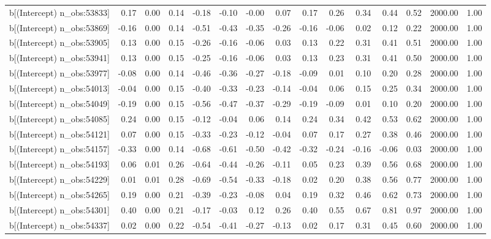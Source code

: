 \begin{table}[ht]
\begin{tabular}{rrrrrrrrrrrrrrr}
  b[(Intercept) n\_obs:53833] & 0.17 & 0.00 & 0.14 & -0.18 & -0.10 & -0.00 & 0.07 & 0.17 & 0.26 & 0.34 & 0.44 & 0.52 & 2000.00 & 1.00 \\ 
  b[(Intercept) n\_obs:53869] & -0.16 & 0.00 & 0.14 & -0.51 & -0.43 & -0.35 & -0.26 & -0.16 & -0.06 & 0.02 & 0.12 & 0.22 & 2000.00 & 1.00 \\ 
  b[(Intercept) n\_obs:53905] & 0.13 & 0.00 & 0.15 & -0.26 & -0.16 & -0.06 & 0.03 & 0.13 & 0.22 & 0.31 & 0.41 & 0.51 & 2000.00 & 1.00 \\ 
  b[(Intercept) n\_obs:53941] & 0.13 & 0.00 & 0.15 & -0.25 & -0.16 & -0.06 & 0.03 & 0.13 & 0.23 & 0.31 & 0.41 & 0.50 & 2000.00 & 1.00 \\ 
  b[(Intercept) n\_obs:53977] & -0.08 & 0.00 & 0.14 & -0.46 & -0.36 & -0.27 & -0.18 & -0.09 & 0.01 & 0.10 & 0.20 & 0.28 & 2000.00 & 1.00 \\ 
  b[(Intercept) n\_obs:54013] & -0.04 & 0.00 & 0.15 & -0.40 & -0.33 & -0.23 & -0.14 & -0.04 & 0.06 & 0.15 & 0.25 & 0.34 & 2000.00 & 1.00 \\ 
  b[(Intercept) n\_obs:54049] & -0.19 & 0.00 & 0.15 & -0.56 & -0.47 & -0.37 & -0.29 & -0.19 & -0.09 & 0.01 & 0.10 & 0.20 & 2000.00 & 1.00 \\ 
  b[(Intercept) n\_obs:54085] & 0.24 & 0.00 & 0.15 & -0.12 & -0.04 & 0.06 & 0.14 & 0.24 & 0.34 & 0.42 & 0.53 & 0.62 & 2000.00 & 1.00 \\ 
  b[(Intercept) n\_obs:54121] & 0.07 & 0.00 & 0.15 & -0.33 & -0.23 & -0.12 & -0.04 & 0.07 & 0.17 & 0.27 & 0.38 & 0.46 & 2000.00 & 1.00 \\ 
  b[(Intercept) n\_obs:54157] & -0.33 & 0.00 & 0.14 & -0.68 & -0.61 & -0.50 & -0.42 & -0.32 & -0.24 & -0.16 & -0.06 & 0.03 & 2000.00 & 1.00 \\ 
  b[(Intercept) n\_obs:54193] & 0.06 & 0.01 & 0.26 & -0.64 & -0.44 & -0.26 & -0.11 & 0.05 & 0.23 & 0.39 & 0.56 & 0.68 & 2000.00 & 1.00 \\ 
  b[(Intercept) n\_obs:54229] & 0.01 & 0.01 & 0.28 & -0.69 & -0.54 & -0.33 & -0.18 & 0.02 & 0.20 & 0.38 & 0.56 & 0.77 & 2000.00 & 1.00 \\ 
  b[(Intercept) n\_obs:54265] & 0.19 & 0.00 & 0.21 & -0.39 & -0.23 & -0.08 & 0.04 & 0.19 & 0.32 & 0.46 & 0.62 & 0.73 & 2000.00 & 1.00 \\ 
  b[(Intercept) n\_obs:54301] & 0.40 & 0.00 & 0.21 & -0.17 & -0.03 & 0.12 & 0.26 & 0.40 & 0.55 & 0.67 & 0.81 & 0.97 & 2000.00 & 1.00 \\ 
  b[(Intercept) n\_obs:54337] & 0.02 & 0.00 & 0.22 & -0.54 & -0.41 & -0.27 & -0.13 & 0.02 & 0.17 & 0.31 & 0.45 & 0.60 & 2000.00 & 1.00 \\ 

\end{tabular}
\end{table}

